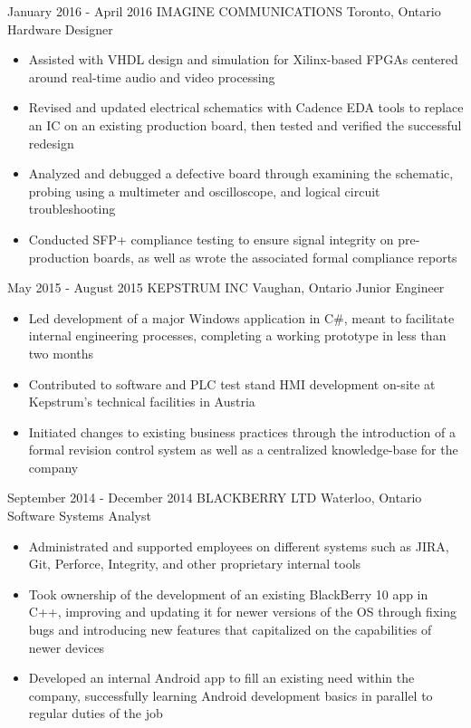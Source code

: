 \documentclass[hidelinks]{kkurucz-cv}
\begin{document}
\begin{entrylist}
\entry
{January 2016 - April 2016}
{IMAGINE COMMUNICATIONS}
{Toronto, Ontario}
{Hardware Designer}
{
\begin{itemize}
	\item Assisted with VHDL design and simulation for Xilinx-based FPGAs centered around real-time audio and video processing
	\item Revised and updated electrical schematics with Cadence EDA tools to replace an IC on an existing production board, then tested and verified the successful redesign
	\item Analyzed and debugged a defective board through examining the schematic, probing using a multimeter and oscilloscope, and logical circuit troubleshooting
	\item Conducted SFP+ compliance testing to ensure signal integrity on pre-production boards, as well as wrote the associated formal compliance reports
\end{itemize}
}

\entry
{May 2015 - August 2015}
{KEPSTRUM INC}
{Vaughan, Ontario}
{Junior Engineer}
{
\begin{itemize}
	\item Led development of a major Windows application in C\#, meant to facilitate internal engineering processes, completing a working prototype in less than two months
	\item Contributed to software and PLC test stand HMI development on-site at Kepstrum’s technical facilities in Austria
	\item Initiated changes to existing business practices through the introduction of a formal revision control system as well as a centralized knowledge-base for the company
\end{itemize}
}

\entry
{September 2014 - December 2014}
{BLACKBERRY LTD}
{Waterloo, Ontario}
{Software Systems Analyst}
{
\begin{itemize}
	\item Administrated and supported employees on different systems such as JIRA, Git, Perforce, Integrity, and other proprietary internal tools
	\item Took ownership of the development of an existing BlackBerry 10 app in C++, improving and updating it for newer versions of the OS through fixing bugs and introducing new features that capitalized on the capabilities of newer devices 
	\item Developed an internal Android app to fill an existing need within the company, successfully learning Android development basics in parallel to regular duties of the job
\end{itemize}
}


\end{entrylist}
\end{document}
